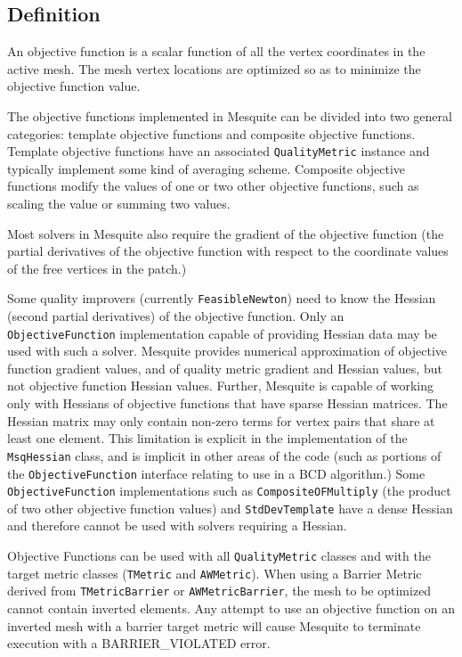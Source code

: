 \subsection{Definition}

An objective function is a scalar function of all the vertex coordinates in the active mesh.  The mesh vertex locations are optimized so as to minimize the objective function value.  

The objective functions implemented in Mesquite can be divided into two general categories: template objective functions and composite objective functions.  Template objective functions have an associated \texttt{QualityMetric} instance and typically implement some kind of averaging scheme.  Composite objective functions modify the values of one or two other objective functions, such as scaling the value or summing two values.

Most solvers in Mesquite also require the gradient of the objective function (the partial derivatives of the objective function with respect to the coordinate values of the free vertices in the patch.)  

\label{sec:Hessian} Some quality improvers (currently \texttt{FeasibleNewton}) need to know the Hessian (second partial derivatives) of the objective function.  Only an \texttt{ObjectiveFunction} implementation capable of providing Hessian data may be used with such a solver.  Mesquite provides numerical approximation of objective function gradient values, and of quality metric gradient and Hessian values, but not objective function Hessian values.  Further, Mesquite is capable of working only with Hessians of objective functions that have sparse Hessian matrices.  The Hessian matrix may only contain non-zero terms for vertex pairs that share at least one element.  This limitation is explicit in the implementation of the \texttt{MsqHessian} class, and is implicit in other areas of the code (such as portions of the \texttt{ObjectiveFunction} interface relating to use in a BCD algorithm.)  Some \texttt{ObjectiveFunction} implementations such as \texttt{CompositeOFMultiply} (the product of two other objective function values) and \texttt{StdDevTemplate} have a dense Hessian and therefore cannot be used with solvers requiring a Hessian.

Objective Functions can be used with all \texttt{QualityMetric} classes and with the target metric classes (\texttt{TMetric} and \texttt{AWMetric}). When using a Barrier Metric derived from \texttt{TMetricBarrier} or \texttt{AWMetricBarrier}, the mesh to be optimized cannot contain inverted elements.  Any attempt to use an objective function on an inverted mesh with a barrier target metric will cause Mesquite to terminate execution with a BARRIER\_VIOLATED error.

